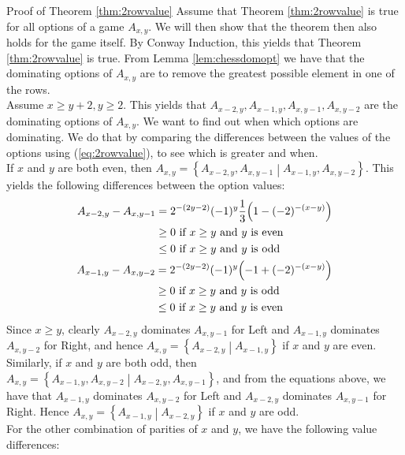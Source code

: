 \begin{proof2}{Proof of Theorem \ref{thm:2rowvalue}}
Assume that Theorem \ref{thm:2rowvalue} is true for all options of a game $A_{x,y}$. We will then show that the theorem then also holds for the game itself. By Conway Induction, this yields that Theorem \ref{thm:2rowvalue} is true.
From Lemma \ref{lem:chessdomopt} we have that the dominating options of $A_{x,y}$ are to remove the greatest possible element in one of the rows. 
\\
Assume $x\ge y+2,y\ge2$. This yields that $A_{x-2,y},A_{x-1,y},A_{x,y-1},A_{x,y-2}$ are the dominating options of $A_{x,y}$. We want to find out when which options are dominating. We do that by comparing the differences between the values of the options using (\ref{eq:2rowvalue}), to see which is greater and when.
\\
If $x$ and $y$ are both even, then $A_{x,y}=\left\{ A_{x-2,y},A_{x,y-1}\middle|A_{x-1,y},A_{x,y-2}\right\}$. This yields the following differences between the option values:
\begin{align*}
\begin{split}
A_{x-2,y}-A_{x,y-1}&=2^{-(2y-2)}(-1)^y\frac{1}{3}\Bigl(1-(-2)^{-(x-y)}\Bigr)\\
&\ge0\text{ if $x\ge y$ and $y$ is even}\\
&\le0\text{ if $x\ge y$ and $y$ is odd}
\end{split}\\
\begin{split}
A_{x-1,y}-A_{x,y-2}&=2^{-(2y-2)}(-1)^y\Bigl(-1+(-2)^{-(x-y)}\Bigr)\\
&\ge0\text{ if $x\ge y$ and $y$ is odd}\\
&\le0\text{ if $x\ge y$ and $y$ is even}
\end{split}
\end{align*}
Since $x\ge y$, clearly $A_{x-2,y}$ dominates $A_{x,y-1}$ for Left and $A_{x-1,y}$ dominates $A_{x,y-2}$ for Right, and hence $A_{x,y}=\left\{A_{x-2,y}\middle|A_{x-1,y}\right\}$ if $x$ and $y$ are even.
\\
Similarly, if $x$ and $y$ are both odd, then $A_{x,y}=\left\{A_{x-1,y},A_{x,y-2}\middle|A_{x-2,y},A_{x,y-1}\right\}$, and from the equations above, we have that $A_{x-1,y}$ dominates $A_{x,y-2}$ for Left and $A_{x-2,y}$ dominates $A_{x,y-1}$ for Right. Hence $A_{x,y}=\left\{A_{x-1,y}\middle|A_{x-2,y}\right\}$ if $x$ and $y$ are odd.
\\
For the other combination of parities of $x$ and $y$, we have the following value differences:

\end{proof2}
